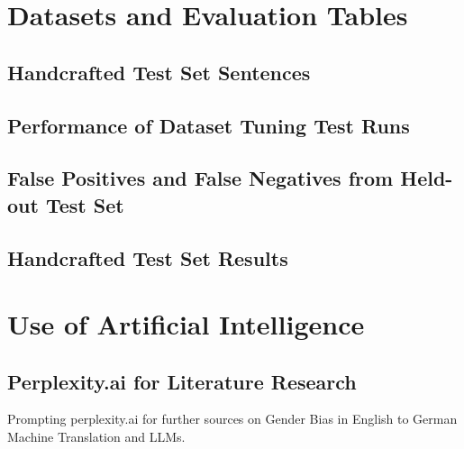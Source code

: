 \appendix
\renewcommand{\thesection}{\Alph{section}}

\section{Datasets and Evaluation Tables}\label{appendix:datasets}

\subsection{Handcrafted Test Set Sentences}
\label{tab:handcrafted_testset}


\subsection{Performance of Dataset Tuning Test Runs}
\label{appendix:dataset_tuning_table}


\subsection{False Positives and False Negatives from Held-out Test Set}
\label{tab:fp_fn_table}


\subsection{Handcrafted Test Set Results}
\label{tab:handcrafted_testset_results}



\section{Use of Artificial Intelligence}\label{appendix:artificial_intelligece}

\subsection{Perplexity.ai for Literature Research}
Prompting perplexity.ai for further sources on Gender Bias in English to German Machine Translation and LLMs. 



